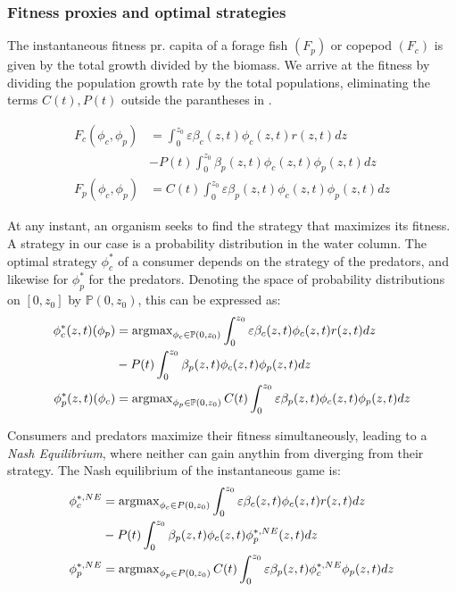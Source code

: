 \subsubsection*{Fitness proxies and optimal strategies}


The instantaneous fitness pr. capita of a forage fish $(F_p)$ or copepod $(F_c)$ is given by the total growth divided by the biomass. We arrive at the fitness by dividing the population growth rate  by the total populations, eliminating the terms $C(t), P(t)$ outside the parantheses in .

\begin{align}
	F_c(\phi_c, \phi_p) &= \int_0^{z_0} \varepsilon \beta_c(z,t)\phi_c(z,t)r(z,t) dz\\ &- P(t)\int_0^{z_0} \beta_p(z,t) \phi_c(z,t) \phi_p(z,t)dz \\
	F_p(\phi_c, \phi_p) &=  C(t) \int_0^{z_0} \varepsilon \beta_p(z,t)\phi_c(z,t)\phi_p(z,t) dz
  \label{eq:fitness}

\end{align}

At any instant, an organism seeks to find the strategy that maximizes its fitness. A strategy in our case is a probability distribution in the water column. The optimal strategy $\phi_c^*$ of a consumer depends on the strategy of the predators, and likewise for $\phi_p^*$ for the predators. Denoting the space of probability distributions on $[0,z_0]$ by $\mathbb{P}(0,z_0)$, this can be expressed as:
\begin{align*}
	\phi_c^*(z,t)(\phi_p) &= \argmax_{\phi_c \in \mathbb{P}(0,z_0)}  \int_0^{z_0} \varepsilon \beta_c(z,t)\phi_c(z,t)r(z,t) dz \\ &- P(t)\int_0^{z_0} \beta_p(z,t) \phi_c(z,t) \phi_p(z,t)dz  \\
	\phi_p^*(z,t)(\phi_c) &= \argmax_{\phi_p \in \mathbb{P}(0,z_0)}C(t) \int_0^{z_0} \varepsilon \beta_p(z,t)\phi_c(z,t)\phi_p(z,t) dz
\end{align*}

Consumers and predators maximize their fitness simultaneously, leading to a \emph{Nash Equilibrium}, where neither can gain anythin from diverging from their strategy. The Nash equilibrium of the instantaneous game is:
\begin{align}
  \label{eq:nash_equilibria}
	\phi_c^{*,NE} &=  \argmax_{\phi_c \in P(0,z_0)}  \int_0^{z_0} \varepsilon \beta_c(z,t)\phi_c(z,t)r(z,t) dz \\ &- P(t)\int_0^{z_0} \beta_p(z,t) \phi_c(z,t) \phi_p^{*,NE}(z,t) dz \\
	\phi_p^{*,NE} &=  \argmax_{\phi_p \in P(0,z_0)}C(t) \int_0^{z_0} \varepsilon \beta_p(z,t)\phi_c^{*,NE} \phi_p(z,t) dz
\end{align}

